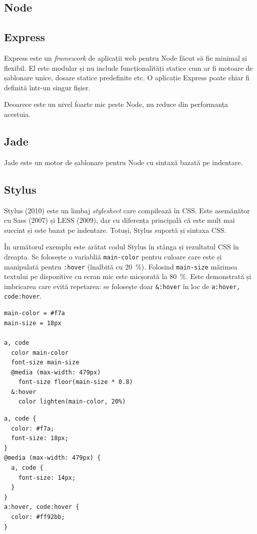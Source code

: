 \documentclass[a4wide,12pt]{report}
\newcommand{\eng}[1]{\emph{#1}} %
\newcommand{\cod}[1]{\texttt{#1}}
\begin{document}
\subsection{Node}

\subsection{Express}

Express este un \eng{framework} de aplicații web pentru Node făcut să fie
minimal și flexibil. El este modular și nu include funcționalități statice cum
ar fi motoare de șablonare unice, dosare statice predefinite etc. O aplicație
Express poate chiar fi definită într-un singur fișier.

Deoarece este un nivel foarte mic peste Node, nu reduce din performanța
acestuia.

\subsection{Jade}

Jade este un motor de șablonare pentru Node cu sintaxă bazată pe indentare.

\subsection{Stylus}

Stylus (2010) este un limbaj \eng{stylesheet} care compilează în CSS. Este
asemănător cu Sass (2007) și LESS (2009), dar cu diferența principală că este
mult mai succint și este bazat pe indentare. Totuși, Stylus suportă și sintaxa
CSS.

În următorul exemplu este arătat codul Stylus în stânga și rezultatul CSS în
dreapta. Se folosește o variabliă \cod{main-color} pentru culoare care este și
manipulată pentru \cod{:hover} (înalbită cu 20~\%). Folosind \cod{main-size}
mărimea textului pe dispozitive cu ecran mic este micșorată la 80~\%. Este
demonstrată și imbricarea care evită repetarea: se folosește doar \cod{\&:hover}
în loc de \cod{a:hover, code:hover}.

\minipage{9cm}
\begin{verbatim}
main-color = #f7a
main-size = 18px

a, code
  color main-color
  font-size main-size
  @media (max-width: 479px)
    font-size floor(main-size * 0.8)
  &:hover
    color lighten(main-color, 20%)
\end{verbatim}
\endminipage
\minipage{4cm}
\begin{verbatim}
a, code {
  color: #f7a;
  font-size: 18px;
}
@media (max-width: 479px) {
  a, code {
    font-size: 14px;
  }
}
a:hover, code:hover {
  color: #ff92bb;
}
\end{verbatim}
\endminipage
\end{document}
